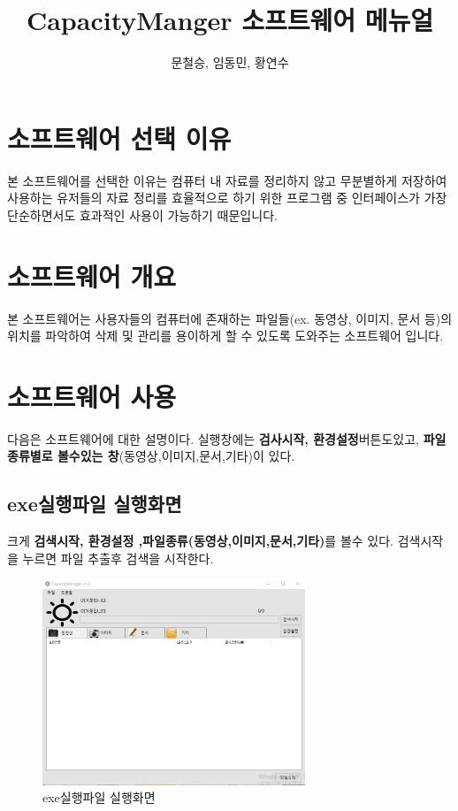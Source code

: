 \documentclass[a4paper, 13pt]{article} %
\title{CapacityManger 소프트웨어 메뉴얼}
\author{문철승, 임동민, 황연수}
\begin{document}
	
	\LARGE \maketitle
	
	\clearpage
	
	\normalsize
	\section{소프트웨어 선택 이유}
	본 소프트웨어를 선택한 이유는 컴퓨터 내 자료를 정리하지 않고 무분별하게 저장하여 사용하는 유저들의 자료 정리를 효율적으로 하기 위한 프로그램 중 인터페이스가 가장 단순하면서도 효과적인 사용이 가능하기 때문입니다.
	\section{소프트웨어 개요}
	본 소프트웨어는 사용자들의 컴퓨터에 존재하는 파일들(ex. 동영상, 이미지, 문서 등)의 위치를 파악하여 삭제 및 관리를 용이하게 할 수 있도록 도와주는 소프트웨어 입니다.
	\section{소프트웨어 사용}
	다음은 소프트웨어에 대한 설명이다.  실행창에는  \textbf{검사시작, 환경설정}버튼도있고,  \textbf{파일종류별로 볼수있는 창}(동영상,이미지,문서,기타)이 있다. 
		\subsection{exe실행파일 실행화면}
		크게 \textbf{검색시작, 환경설정 ,파일종류(동영상,이미지,문서,기타)}를 볼수 있다.
		검색시작을 누르면 파일 추출후 검색을 시작한다.
	\begin{figure}[h]
		\centering
		\includegraphics[width=0.7\textwidth]{Figures/exe2}
		\caption{exe실행파일 실행화면}
		\label{fig:exe2}
	\end{figure}
\end{document}
